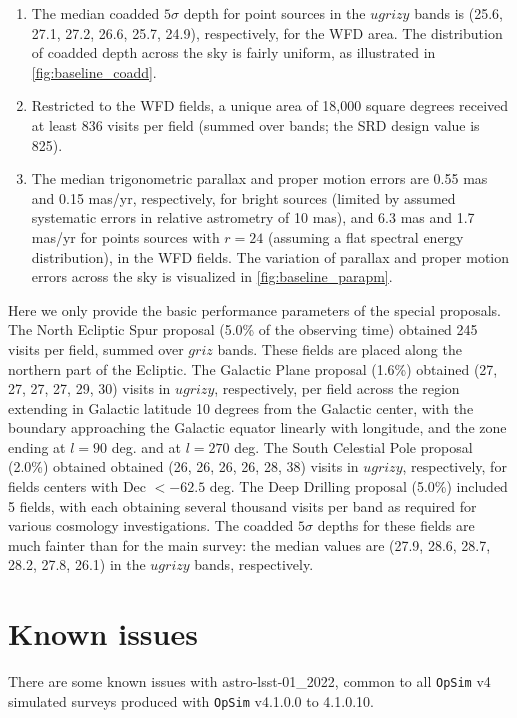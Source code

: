 \documentclass[DM,lsstdraft,authoryear,toc]{lsstdoc}
\newcommand{\opsim}{\texttt{OpSim}\xspace}
\begin{document}
\begin{enumerate}
\item The median coadded $5\sigma$ depth
for point sources in the $ugrizy$ bands is (25.6, 27.1, 27.2, 26.6,
25.7, 24.9), respectively, for the WFD area. The distribution
of coadded depth across the sky is fairly uniform, as illustrated in \autoref{fig:baseline_coadd}.

\item Restricted to the WFD fields, a unique area of
18,000 square degrees received at least 836 visits per field (summed over bands;
the SRD design value is 825).

\item The median trigonometric parallax and proper motion errors are
0.55 mas and 0.15 mas/yr, respectively, for bright sources (limited by
assumed systematic errors in relative astrometry of 10 mas), and 6.3
mas and 1.7 mas/yr for points sources with $r=24$ (assuming a flat
spectral energy distribution), in the WFD fields. The variation of parallax
and proper motion errors across the sky is visualized in \autoref{fig:baseline_parapm}.
\end{enumerate}

Here we only provide the basic
performance parameters of the special proposals. 
The North Ecliptic Spur proposal (5.0\% of the observing time) obtained  245 visits per field, summed over $griz$ bands. 
These fields are placed along the northern part of the Ecliptic. 
The Galactic Plane proposal (1.6\%) obtained (27, 27, 27, 27, 29, 30) visits in $ugrizy$, respectively, per field
across the region extending in Galactic latitude 10 degrees
from the Galactic center, with the boundary approaching the Galactic
equator linearly with longitude, and the zone ending at $l=90$ deg.
and at $l=270$ deg. 
The South Celestial Pole proposal (2.0\%) obtained
obtained (26, 26, 26, 26, 28, 38) visits in $ugrizy$, respectively, for fields centers with Dec $<-62.5$ deg. 
The Deep Drilling proposal (5.0\%) included 5 fields, with each obtaining several thousand visits per band 
as required for various cosmology investigations. The coadded $5\sigma$ depths for these fields are much 
fainter than for the main survey: the median values are (27.9, 28.6, 28.7, 28.2, 27.8, 26.1) in the $ugrizy$ bands, respectively.


\section{Known issues}

There are some known issues with astro-lsst-01\_2022, common to all \opsim v4 simulated surveys produced with \opsim v4.1.0.0 to 4.1.0.10.
\end{document}
